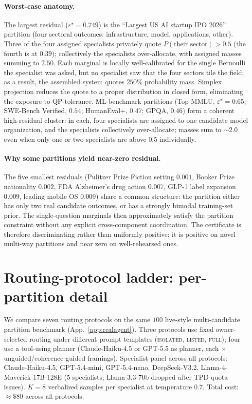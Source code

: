 \documentclass{article}
\theoremstyle{plain}
\theoremstyle{definition}
\theoremstyle{remark}
\newcommand{\eps}{\varepsilon}
\begin{document}
\paragraph{Worst-case anatomy.}
The largest residual ($\eps^\star=0.749$) is the ``Largest US AI
startup IPO 2026'' partition (four sectoral outcomes:
infrastructure, model, applications, other). Three of the four
assigned specialists privately quote $P(\text{their sector}) > 0.5$
(the fourth is at $0.39$); collectively the specialists
over-allocate, with assigned masses summing to $2.50$. Each
marginal is locally well-calibrated for the single Bernoulli the
specialist was asked, but no specialist saw that the four sectors
tile the field; as a result, the assembled system quotes $250\%$
probability mass. Simplex projection reduces the quote to a
proper distribution in closed form, eliminating the exposure to
QP-tolerance. ML-benchmark partitions (Top MMLU,
$\eps^\star{=}0.65$; SWE-Bench Verified, $0.54$; HumanEval+,
$0.47$; GPQA, $0.46$) form a coherent high-residual cluster: in
each, four specialists are assigned to one candidate model
organization, and the specialists collectively over-allocate;
masses sum to $\sim\!2.0$ even when only one or two specialists
are above $0.5$ individually.

\paragraph{Why some partitions yield near-zero residual.}
The five smallest residuals (Pulitzer Prize Fiction setting
$0.001$, Booker Prize nationality $0.002$, FDA Alzheimer's drug
action $0.007$, GLP-1 label expansion $0.009$, leading mobile OS
$0.009$) share a common structure: the partition either has only
two real candidate outcomes, or has a strongly bimodal
training-set prior. The single-question marginals then
approximately satisfy the partition constraint without any
explicit cross-component coordination. The certificate is
therefore discriminating rather than uniformly positive: it is
positive on novel multi-way partitions and near zero on
well-rehearsed ones.

\section{Routing-protocol ladder: per-partition detail}
\label{app:context}

We compare seven routing protocols on the same $100$ live-style
multi-candidate partition benchmark (App.~\ref{app:realagent}). Three
protocols use fixed owner-selected routing under different prompt
templates (\textsc{isolated}, \textsc{listed}, \textsc{full}); four
use a tool-using planner (Claude-Haiku-4.5 or GPT-5.5 as planner,
each $\times$ unguided/coherence-guided framings). Specialist panel
across all protocols: Claude-Haiku-4.5, GPT-5.4-mini,
GPT-5.4-nano, DeepSeek-V3.2, Llama-4-Maverick-17B-128E
($5$ specialists; Llama-3.3-70b dropped after TPD-quota issues).
$K\!=\!8$ verbalized samples per specialist at temperature $0.7$.
Total cost: $\approx\!\$80$ across all protocols.
\end{document}

